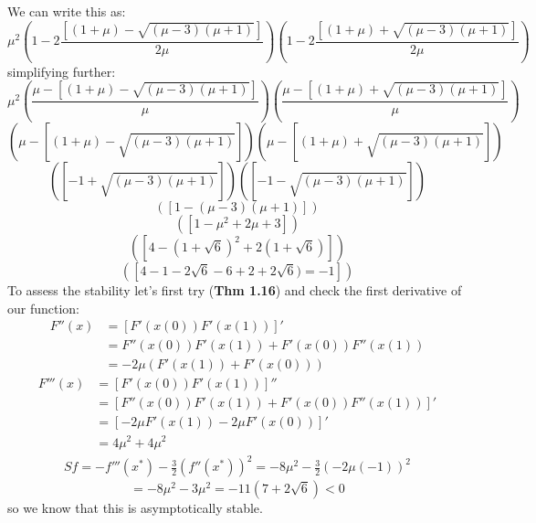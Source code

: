 \documentclass[12pt,letterpaper]{article}
\theoremstyle{definition}
\begin{document}
\begin{changemargin}{.5cm}{0cm}
    We can write this as:
    \begin{equation*}
       \mu^2\left(1-2\frac{\left[ (1+\mu) -\sqrt{(\mu-3)(\mu+1)} \right]}{2\mu}\right)\left(1-2\frac{\left[ (1+\mu) +\sqrt{(\mu-3)(\mu+1)} \right]}{2\mu}\right)
    \end{equation*}
    simplifying further:
    \begin{equation*}
       \mu^2\left(\frac{\mu-\left[ (1+\mu) -\sqrt{(\mu-3)(\mu+1)} \right]}{\mu}\right)\left(\frac{\mu-\left[ (1+\mu) +\sqrt{(\mu-3)(\mu+1)} \right]}{\mu}\right)
    \end{equation*}
    \begin{equation*}
       \left(\mu-\left[ (1+\mu) -\sqrt{(\mu-3)(\mu+1)} \right]\right)\left(\mu-\left[ (1+\mu) +\sqrt{(\mu-3)(\mu+1)} \right]\right)
    \end{equation*}
    \begin{equation*}
       \left(\left[ -1 +\sqrt{(\mu-3)(\mu+1)} \right]\right)\left(\left[ -1-\sqrt{(\mu-3)(\mu+1)} \right]\right)
    \end{equation*}
    \begin{equation*}
       \left(\left[ 1 - (\mu-3)(\mu+1) \right]\right)
    \end{equation*}
    \begin{equation*}
       \left(\left[ 1- \mu^2+2\mu+3 \right]\right)
    \end{equation*}
    \begin{equation*}
       \left(\left[ 4 - (1+\sqrt{6})^2+2(1+\sqrt{6}) \right]\right)
    \end{equation*}
    \begin{equation*}
       \left(\left[ 4 - 1-2\sqrt{6}-6+2+2\sqrt{6}) = -1 \right]\right)
    \end{equation*}
    To assess the stability let's first try (\textbf{Thm 1.16}) and check the first derivative of our function:
    \begin{align*}
        F''(x) &= [F'(x(0))F'(x(1))]'\\
        &= F''(x(0))F'(x(1))+F'(x(0))F''(x(1))\\
        &= -2\mu( F'(x(1))+F'(x(0)))
    \end{align*}
    \begin{align*}
        F'''(x) &= [F'(x(0))F'(x(1))]''\\
        &= [F''(x(0))F'(x(1))+F'(x(0))F''(x(1))]'\\
        &= [-2\mu F'(x(1))-2\mu F'(x(0))]'\\
        &= 4\mu^2 +4\mu^2
    \end{align*}
    \begin{align*}
        Sf = -f'''(x^*)-\frac 3 2 (f''(x^*))^2 = -8\mu^2 - \frac{3}{2}(-2\mu(-1))^2
    \end{align*}
    \begin{equation*}
        =-8\mu^2-3\mu^2= -11(7+2\sqrt{6})<0
    \end{equation*}
    so we know that this is asymptotically stable. 
    
\end{changemargin}
\end{document}
